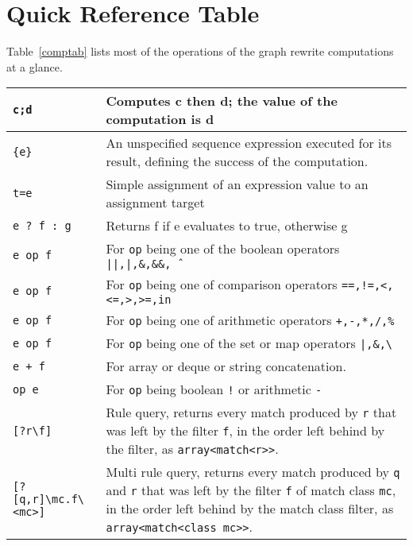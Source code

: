 
\section{Quick Reference Table}

Table~\ref{comptab} lists most of the operations of the graph rewrite computations at a glance.

\begin{table}[htbp]
\begin{minipage}{\linewidth} \renewcommand{\footnoterule}{} 
\begin{tabularx}{\linewidth}{|lX|}
\hline
\texttt{c;d} & Computes c then d; the value of the computation is d\\
\hline
\texttt{\{e\}} & An unspecified sequence expression executed for its result, defining the success of the computation.\\
\hline
\texttt{t=e} & Simple assignment of an expression value to an assignment target\\
\hline
\texttt{e ? f : g} & Returns f if e evaluates to true, otherwise g \\
\texttt{e op f} & For \texttt{op} being one of the boolean operators \texttt{||,|,\&,\&\&,\^\ } \\
\texttt{e op f} & For \texttt{op} being one of comparison operators \texttt{==,!=,<,<=,>,>=,in} \\
\texttt{e op f} & For \texttt{op} being one of arithmetic operators \texttt{+,-,*,/,\%} \\
\texttt{e op f} & For \texttt{op} being one of the set or map operators \texttt{|,\&,\textbackslash} \\
\texttt{e + f} & For array or deque or string concatenation. \\
\texttt{op e} & For \texttt{op} being boolean \texttt{!} or arithmetic \texttt{-}\\
\hline
\texttt{[?r\textbackslash f]} & Rule query, returns every match produced by \texttt{r} that was left by the filter \texttt{f}, in the order left behind by the filter, as \texttt{array<match<r>>}. \\
\texttt{[?[q,r]\textbackslash mc.f\textbackslash<mc>]} & Multi rule query, returns every match produced by \texttt{q} and \texttt{r} that was left by the filter \texttt{f} of match class \texttt{mc}, in the order left behind by the match class filter, as \texttt{array<match<class mc>>}. \\

\end{tabularx}
\end{minipage}
\end{table}

